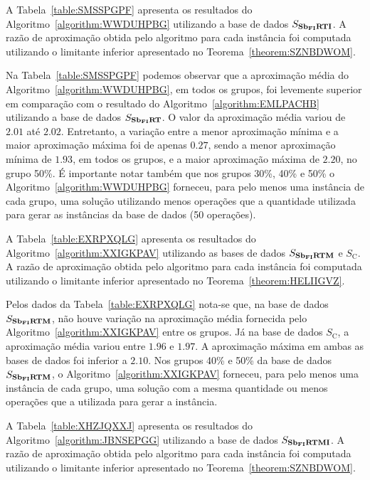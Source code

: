 A Tabela~\ref{table:SMSSPGPF} apresenta os resultados do Algoritmo~\ref{algorithm:WWDUHPBG} utilizando a base de dados $S_{\textbf{Sb\textsubscript{FI}RTI}}{}$. A razão de aproximação obtida pelo algoritmo para cada instância foi computada utilizando o limitante inferior apresentado no Teorema~\ref{theorem:SZNBDWOM}.



Na Tabela~\ref{table:SMSSPGPF} podemos observar que a aproximação média do Algoritmo~\ref{algorithm:WWDUHPBG}, em todos os grupos, foi levemente superior em comparação com o resultado do Algoritmo~\ref{algorithm:EMLPACHB} utilizando a base de dados $S_{\textbf{Sb\textsubscript{FI}RT}}{}$. O valor da aproximação média variou de $2.01$ até $2.02$. Entretanto, a variação entre a menor aproximação mínima e a maior aproximação máxima foi de apenas $0.27$, sendo a menor aproximação mínima de $1.93$, em todos os grupos, e a maior aproximação máxima de $2.20$, no grupo 50\%. É importante notar também que nos grupos 30\%, 40\% e 50\%  o Algoritmo~\ref{algorithm:WWDUHPBG} forneceu, para pelo menos uma instância de cada grupo, uma solução utilizando menos operações que a quantidade utilizada para gerar as instâncias da base de dados (50 operações).

A Tabela~\ref{table:EXRPXQLG} apresenta os resultados do Algoritmo~\ref{algorithm:XXIGKPAV} utilizando as bases de dados $S_{\textbf{Sb\textsubscript{FI}RTM}}{}$ e $S_{\text{C}}$. A razão de aproximação obtida pelo algoritmo para cada instância foi computada utilizando o limitante inferior apresentado no Teorema~\ref{theorem:HELIIGVZ}.



Pelos dados da Tabela~\ref{table:EXRPXQLG} nota-se que, na base de dados $S_{\textbf{Sb\textsubscript{FI}RTM}}{}$, não houve variação na aproximação média fornecida pelo Algoritmo~\ref{algorithm:XXIGKPAV} entre os grupos. Já na base de dados $S_{\text{C}}$, a aproximação média variou entre $1.96$ e $1.97$. A aproximação máxima em ambas as bases de dados foi inferior a $2.10$. Nos grupos 40\% e 50\% da base de dados $S_{\textbf{Sb\textsubscript{FI}RTM}}{}$, o Algoritmo~\ref{algorithm:XXIGKPAV} forneceu, para pelo menos uma instância de cada grupo, uma solução com a mesma quantidade ou menos operações que a utilizada para gerar a instância.

A Tabela~\ref{table:XHZJQXXJ} apresenta os resultados do Algoritmo~\ref{algorithm:JBNSEPGG} utilizando a base de dados $S_{\textbf{Sb\textsubscript{FI}RTMI}}{}$. A razão de aproximação obtida pelo algoritmo para cada instância foi computada utilizando o limitante inferior apresentado no Teorema~\ref{theorem:SZNBDWOM}.


